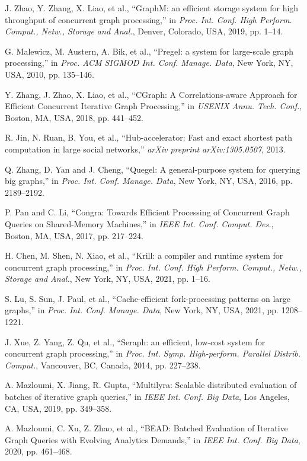 \documentclass[lettersize,journal]{IEEEtran} %
\begin{document}
\begin{thebibliography}{100}
  J. Zhao, Y. Zhang, X. Liao, et al., ``GraphM: an efficient storage system for high throughput of concurrent graph processing,'' in \textit{Proc. Int. Conf. High Perform. Comput., Netw., Storage and Anal.}, Denver, Colorado, USA, 2019, pp. 1--14.
  
  G. Malewicz, M. Austern, A. Bik, et al., ``Pregel: a system for large-scale graph processing,'' in \textit{Proc. ACM SIGMOD Int. Conf. Manage. Data}, New York, NY, USA, 2010, pp. 135--146.
  
  Y. Zhang, J. Zhao, X. Liao, et al., ``{CGraph}: A Correlations-aware Approach for Efficient Concurrent Iterative Graph Processing,'' in \textit{USENIX Annu. Tech. Conf.}, Boston, MA, USA, 2018, pp. 441--452.
  
  R. Jin, N. Ruan, B. You, et al., ``Hub-accelerator: Fast and exact shortest path computation in large social networks,'' \textit{arXiv preprint arXiv:1305.0507}, 2013.
  
  Q. Zhang, D. Yan and J. Cheng, ``Quegel: A general-purpose system for querying big graphs,'' in \textit{Proc. Int. Conf. Manage. Data}, New York, NY, USA, 2016, pp. 2189--2192.
  
  P. Pan and C. Li, ``Congra: Towards Efficient Processing of Concurrent Graph Queries on Shared-Memory Machines,'' in \textit{IEEE Int. Conf. Comput. Des.}, Boston, MA, USA, 2017, pp. 217--224.
  
  H. Chen, M. Shen, N. Xiao, et al., ``Krill: a compiler and runtime system for concurrent graph processing,'' in \textit{Proc. Int. Conf. High Perform. Comput., Netw., Storage and Anal.}, New York, NY, USA, 2021, pp. 1--16.
  
  S. Lu, S. Sun, J. Paul, et al., ``Cache-efficient fork-processing patterns on large graphs,'' in \textit{Proc. Int. Conf. Manage. Data}, New York, NY, USA, 2021, pp. 1208--1221.
  
  J. Xue, Z. Yang, Z. Qu, et al., ``Seraph: an efficient, low-cost system for concurrent graph processing,'' in \textit{Proc. Int. Symp. High-perform. Parallel Distrib. Comput.}, Vancouver, BC, Canada, 2014, pp. 227--238.
  
  A. Mazloumi, X. Jiang, R. Gupta, ``Multilyra: Scalable distributed evaluation of batches of iterative graph queries,'' in \textit{IEEE Int. Conf. Big Data}, Los Angeles, CA, USA, 2019, pp. 349--358.
  
  A. Mazloumi, C. Xu, Z. Zhao, et al., ``BEAD: Batched Evaluation of Iterative Graph Queries with Evolving Analytics Demands,'' in \textit{IEEE Int. Conf. Big Data}, 2020, pp. 461--468.
  
  
  
  
  \end{thebibliography}
\end{document}
